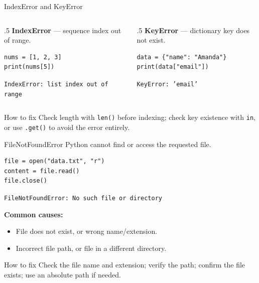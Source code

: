 \documentclass[9pt,aspectratio=169,xcolor=table]{beamer}
\begin{document}
\begin{frame}[fragile]{IndexError and KeyError}
    \leavevmode
    \begin{columns}[t]
        \begin{column}{.5\textwidth}
            \textbf{IndexError} --- sequence index out of range.
\begin{lstlisting}
nums = [1, 2, 3]
print(nums[5])
\end{lstlisting}
            \texttt{\scriptsize IndexError: list index out of range}
        \end{column}
        \begin{column}{.5\textwidth}
            \textbf{KeyError} --- dictionary key does not exist.
\begin{lstlisting}
data = {"name": "Amanda"}
print(data["email"])
\end{lstlisting}
            \texttt{\scriptsize KeyError: 'email'}
        \end{column}
    \end{columns}

    \vspace{2mm}
    \begin{block}{How to fix}
        \small Check length with \texttt{len()} before indexing; check
        key existence with \texttt{in}, or use \texttt{.get()} to avoid
        the error entirely.
    \end{block}
\end{frame}

\begin{frame}[fragile]{FileNotFoundError}
    \leavevmode
    Python cannot find or access the requested file.

\begin{lstlisting}
file = open("data.txt", "r")
content = file.read()
file.close()
\end{lstlisting}
    \texttt{FileNotFoundError: No such file or directory}

    \vspace{3mm}
    \textbf{Common causes:}
    \begin{itemize}
        \item File does not exist, or wrong name/extension.
        \item Incorrect file path, or file in a different directory.
    \end{itemize}

    \vspace{2mm}
    \begin{block}{How to fix}
        \small Check the file name and extension; verify the path;
        confirm the file exists; use an absolute path if needed.
    \end{block}
\end{frame}
\end{document}

